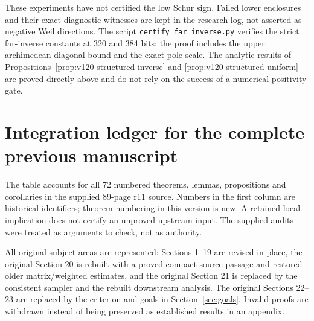 \documentclass[11pt]{article}
\theoremstyle{remark}
\begin{document}
These experiments have not certified the low Schur sign. Failed
lower enclosures and their exact diagnostic witnesses are kept in the
research log, not asserted as negative Weil directions. The script \texttt{certify\_far\_inverse.py} verifies the
strict far-inverse constants at 320 and 384 bits; the proof includes
the upper archimedean diagonal bound and the exact pole scale.
The analytic
results of Propositions~\ref{prop:v120-structured-inverse} and
\ref{prop:v120-structured-uniform} are proved directly above and
do not rely on the success of a numerical positivity gate.

\section{Integration ledger for the complete previous manuscript}\label{app:ledger}
The table accounts for all 72 numbered theorems, lemmas, propositions and
corollaries in the supplied 89-page r11 source. Numbers in the first column
are historical identifiers; theorem numbering in this version is new.
A retained local implication does not certify an unproved upstream input.
The supplied audits were treated as arguments to check, not as authority.

All original subject areas are represented: Sections 1--19 are revised in
place, the original Section 20 is rebuilt with a proved compact-source passage
and restored older matrix/weighted estimates, and the original Section 21
is replaced by the consistent sampler and the rebuilt downstream analysis.
The original Sections 22--23 are replaced by the criterion and goals in
Section~\ref{sec:goals}. Invalid proofs are withdrawn instead of being
preserved as established results in an appendix.
\end{document}
